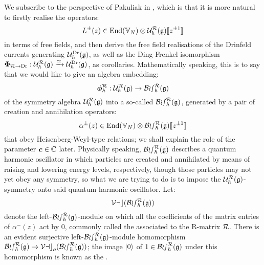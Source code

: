         We subscribe to the perspective of Pakuliak in \cite{pakuliak_bosonisation_of_L_operators_for_quantum_affine_sl_2}, which is that it is more natural to firstly realise the operators:
            $$L^{\pm}(z) \in \End(\bbV_N) \tensor \calU_{\hbar}^{\calR}(\g)[\![z^{\pm 1}]\!]$$
        in terms of free fields, and then derive the free field realisations of the Drinfeld currents generating $\mathcal{U}_{\hbar}^{\mathrm{Dr}}(\mathfrak{g})$, as well as the Ding-Frenkel isomorphism $\boldsymbol{\Phi}_{\mathcal{R} \to \mathrm{Dr}}: \mathcal{U}_{\hbar}^{\mathcal{R}}(\mathfrak{g}) \xrightarrow[]{\simeq} \mathcal{U}_{\hbar}^{\mathrm{Dr}}(\mathfrak{g})$, as corollaries. Mathematically speaking, this is to say that we would like to give an algebra embedding:
            $$\boldsymbol{\phi}_{\hbar}^{\mathcal{R}}: \mathcal{U}_{\hbar}^{\mathcal{R}}(\mathfrak{g}) \to \mathcal{Bos}_{\hbar}^{\mathcal{R}}(\mathfrak{g})$$
        of the symmetry algebra $\mathcal{U}_{\hbar}^{\mathcal{R}}(\mathfrak{g})$ into a so-called  $\mathcal{Bos}_{\hbar}^{\mathcal{R}}(\mathfrak{g})$, generated by a pair of creation and annihilation operators:
            $$\alpha^{\pm}(z) \in \End(\bbV_N) \tensor \boson_{\hbar}^{\calR}(\g)[\![z^{\pm 1}]\!]$$
        that obey Heisenberg-Weyl-type relations; we shall explain the role of the parameter $\boldsymbol{c} \in \mathbb{C}$ later. Physically speaking, $\mathcal{Bos}_{\hbar}^{\mathcal{R}}(\mathfrak{g})$ describes a quantum harmonic oscillator in which particles are created and annihilated by means of raising and lowering energy levels, respectively, though those particles may not yet obey any symmetry, so what we are trying to do is to impose the $\mathcal{U}_{\hbar}^{\mathcal{R}}(\mathfrak{g})$-symmetry onto said quantum harmonic oscillator. Let:
            $$\mathcal{Vac}(\mathcal{Bos}_{\hbar}^{\mathcal{R}}(\mathfrak{g}))$$
        denote the left-$\mathcal{Bos}_{\hbar}^{\mathcal{R}}(\mathfrak{g})$-module on which all the coefficients of the matrix entries of $\alpha^-(z)$ act by $0$, commonly called the  associated to the R-matrix $\mathcal{R}$. There is an evident surjective left-$\mathcal{Bos}_{\hbar}^{\mathcal{R}}(\mathfrak{g})$-module homomorphism $\mathcal{Bos}_{\hbar}^{\mathcal{R}}(\mathfrak{g}) \to \mathcal{Vac}_{\boldsymbol{c}}(\mathcal{Bos}_{\hbar}^{\mathcal{R}}(\mathfrak{g}))$; the image $\lvert {0} \rangle$ of $1 \in \mathcal{Bos}_{\hbar}^{\mathcal{R}}(\mathfrak{g})$ under this homomorphism is known as the .
         
